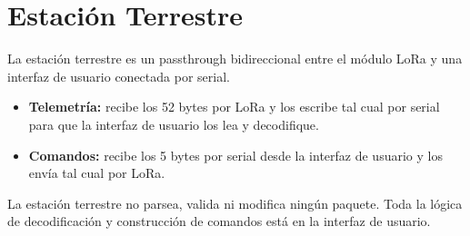 \documentclass[11pt,a4paper]{article}
\begin{document}
\section{Estación Terrestre}

La estación terrestre es un passthrough bidireccional entre el módulo LoRa y una interfaz de usuario conectada por serial.

\begin{itemize}
    \item \textbf{Telemetría:} recibe los 52 bytes por LoRa y los escribe tal cual por serial para que la interfaz de usuario los lea y decodifique.
    \item \textbf{Comandos:} recibe los 5 bytes por serial desde la interfaz de usuario y los envía tal cual por LoRa.
\end{itemize}

La estación terrestre no parsea, valida ni modifica ningún paquete. Toda la lógica de decodificación y construcción de comandos está en la interfaz de usuario.
\end{document}
